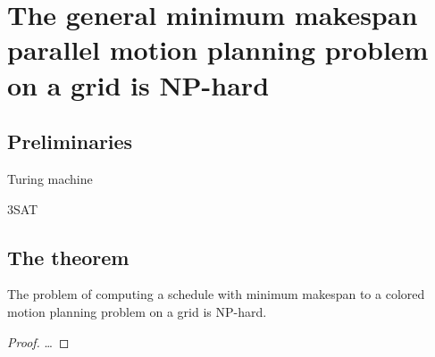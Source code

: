 \section{The general minimum makespan parallel motion planning problem on a grid is NP-hard}

\cite{siamcomp/DemaineFKMS19} \cite{corr/YuL15c}

\subsection{Preliminaries}

\begin{definition}
	Turing machine
\end{definition}

\begin{definition}
	3SAT
\end{definition}

\subsection{The theorem}

\begin{theorem}
	The problem of computing a schedule with minimum makespan to a colored motion planning problem on a grid is NP-hard.
\end{theorem}

\begin{proof}
	\dots
\end{proof}
